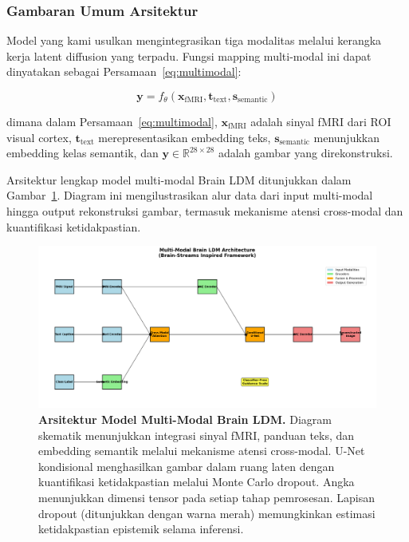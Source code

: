 \subsubsection{Gambaran Umum Arsitektur}
Model yang kami usulkan mengintegrasikan tiga modalitas melalui kerangka kerja latent diffusion yang terpadu. Fungsi mapping multi-modal ini dapat dinyatakan sebagai Persamaan~\ref{eq:multimodal}:

\begin{equation}
\mathbf{y} = f_{\theta}(\mathbf{x}_{\text{fMRI}}, \mathbf{t}_{\text{text}}, \mathbf{s}_{\text{semantic}})
\label{eq:multimodal}
\end{equation}

dimana dalam Persamaan~\ref{eq:multimodal}, $\mathbf{x}_{\text{fMRI}}$ adalah sinyal fMRI dari ROI visual cortex, $\mathbf{t}_{\text{text}}$ merepresentasikan embedding teks, $\mathbf{s}_{\text{semantic}}$ menunjukkan embedding kelas semantik, dan $\mathbf{y} \in \mathbb{R}^{28 \times 28}$ adalah gambar yang direkonstruksi.

Arsitektur lengkap model multi-modal Brain LDM ditunjukkan dalam Gambar~\ref{fig:architecture_methods}. Diagram ini mengilustrasikan alur data dari input multi-modal hingga output rekonstruksi gambar, termasuk mekanisme atensi cross-modal dan kuantifikasi ketidakpastian.

\begin{figure}[htbp]
\centering
\includegraphics[width=\textwidth]{../figures/Fig4_architecture.png}
\caption{\textbf{Arsitektur Model Multi-Modal Brain LDM.} Diagram skematik menunjukkan integrasi sinyal fMRI, panduan teks, dan embedding semantik melalui mekanisme atensi cross-modal. U-Net kondisional menghasilkan gambar dalam ruang laten dengan kuantifikasi ketidakpastian melalui Monte Carlo dropout. Angka menunjukkan dimensi tensor pada setiap tahap pemrosesan. Lapisan dropout (ditunjukkan dengan warna merah) memungkinkan estimasi ketidakpastian epistemik selama inferensi.}
\label{fig:architecture_methods}
\end{figure}

